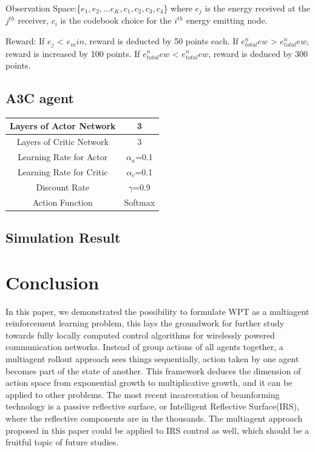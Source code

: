\documentclass[journal]{IEEEtran}
\begin{document}
Observation Space:\{$e_1,e_2,...e_K,c_1,c_2,c_3,c_4$\}
where $e_j$ is the energy received at the $j^{th}$ receiver, $c_i$ is the codebook choice for the $i^{th}$ energy emitting node.

Reward: If $e_j$ < $e_min$, reward is deducted by 50 points each. If $e_{total}^new$ > $e_{total}^new$, reward is increased by 100 points. If $e_{total}^new$ < $e_{total}^new$, reward is deduced by 300 points.

\subsection{A3C agent}
\begin{small}
\begin{center}
\begin{tabular}{ c c }
\hline
Layers of Actor Network & 3\\
\hline
Layers of Critic Network & 3\\
\hline
Learning Rate for Actor & $\alpha_a$=0.1\\
\hline
Learning Rate for Critic & $\alpha_c$=0.1\\
\hline
Discount Rate & $\gamma$=0.9 \\
\hline
Action Function & Softmax \\
\hline

\end{tabular}
\end{center}
\end{small}

\subsection{Simulation Result}
\section{Conclusion}
In this paper, we demonstrated the possibility to formulate WPT as a multiagent reinforcement learning problem, this lays the groundwork for further study towards fully locally computed control algorithms for wirelessly powered communication networks. Instead of group actions of all agents together, a multiagent rollout approach sees things sequentially, action taken by one agent becomes part of the state of another. This framework deduces the dimension of action space from exponential growth to multiplicative growth, and it can be applied to other problems. The most recent incarceration of beamforming technology is a passive reflective surface, or Intelligent Reflective Surface(IRS), where the reflective components are in the thousands. The multiagent approach proposed in this paper could be applied to IRS control as well, which should be a fruitful topic of future studies.








\end{document}
